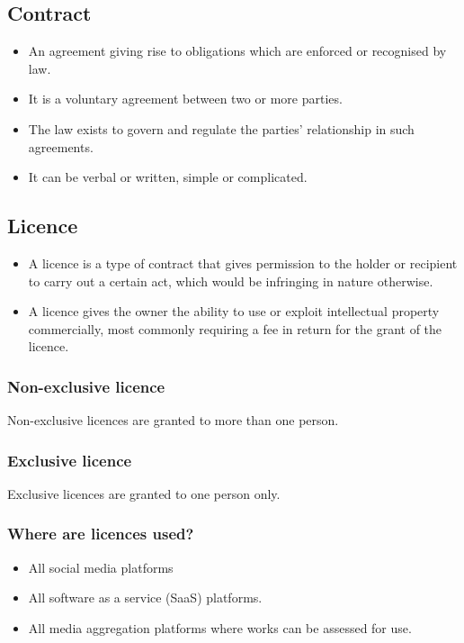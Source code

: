 \documentclass[11pt]{article}
\begin{document}
\subsection{Contract}
\label{sec:org9058cf9}
\begin{itemize}
\item An agreement giving rise to obligations which are enforced or recognised by law.
\item It is a voluntary agreement between two or more parties.
\item The law exists to govern and regulate the parties' relationship in such agreements.
\item It can be verbal or written, simple or complicated.
\end{itemize}

\subsection{Licence}
\label{sec:orga8b3c6e}
\begin{itemize}
\item A licence is a type of contract that gives permission to the holder or recipient to carry out a certain act, which would be infringing in nature otherwise.
\item A licence gives the owner the ability to use or exploit intellectual property commercially, most commonly requiring a fee in return for the grant of the licence.
\end{itemize}

\subsubsection{Non-exclusive licence}
\label{sec:org12ef2db}
Non-exclusive licences are granted to more than one person.

\subsubsection{Exclusive licence}
\label{sec:orgc696a91}
Exclusive licences are granted to one person only.

\subsubsection{Where are licences used?}
\label{sec:orgdf14318}
\begin{itemize}
\item All social media platforms
\item All software as a service (SaaS) platforms.
\item All media aggregation platforms where works can be assessed for use.
\end{itemize}
\end{document}
